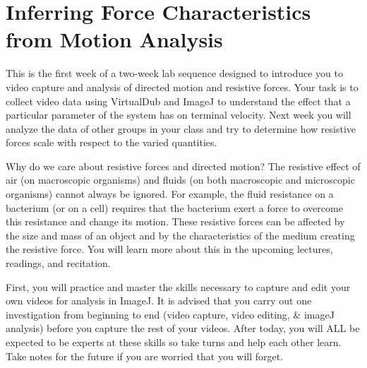 \chapter{Inferring Force Characteristics from Motion Analysis}
\thispagestyle{fancy}
%
This is the first week of a two-week lab sequence designed to introduce you to video capture and analysis of directed motion and resistive forces.
Your task is to collect video data using VirtualDub and ImageJ to understand the effect that a particular parameter of the system has on terminal velocity.
Next week you will analyze the data of other groups in your class and try to determine how resistive forces scale with respect to the varied quantities.
\par
Why do we care about resistive forces and directed motion?
The resistive effect of air (on macroscopic organisms) and fluids (on both macroscopic and microscopic organisms) cannot always be ignored.
For example, the fluid resistance on a bacterium (or on a cell) requires that the bacterium exert a force to overcome this resistance and change its motion.
These resistive forces can be affected by the size and mass of an object and by the characteristics of the medium creating the resistive force.
You will learn more about this in the upcoming lectures, readings, and recitation.
\par 
First, you will practice and master the skills necessary to capture and edit your own videos for analysis in ImageJ.
It is advised that you carry out one investigation from beginning to end (video capture, video editing, \& imageJ analysis) before you capture the rest of your videos.
After today, you will ALL be expected to be experts at these skills so take turns and help each other learn.
Take notes for the future if you are worried that you will forget.

